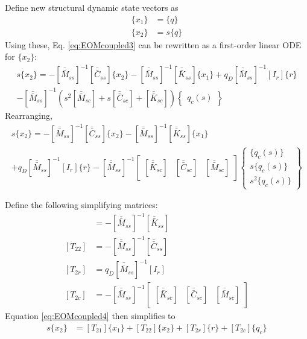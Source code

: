 Define new structural dynamic state vectors as
\begin{align}
	\{x_1\} &= \{q\} \\
	\{x_2\} &= s \{q\}
\end{align}
Using these, Eq. \ref{eq:EOMcoupled3} can be rewritten as a first-order linear ODE for $\{x_2\}$:
\begin{multline}
	s \{x_2\} = - \left[\bar{\bar{M}}_{ss}\right]^{-1} \left[\bar{\bar{C}}_{ss}\right] \{x_2\}
	- \left[\bar{\bar{M}}_{ss}\right]^{-1} \left[\bar{\bar{K}}_{ss}\right] \{x_1\}
	+ q_D \left[\bar{\bar{M}}_{ss}\right]^{-1} [I_r] \{r\}
	\\
	- \left[\bar{\bar{M}}_{ss}\right]^{-1} \left( s^2 \left[\bar{\bar{M}}_{sc}\right] + s \left[\bar{\bar{C}}_{sc}\right] + \left[\bar{\bar{K}}_{sc}\right] \right) \begin{Bmatrix} q_c(s) \end{Bmatrix}
\end{multline}
Rearranging,
\begin{multline}
	\label{eq:EOMcoupled4}
	s\{x_2\} = - \left[\bar{\bar{M}}_{ss}\right]^{-1} \left[\bar{\bar{C}}_{ss}\right] \{x_2\}
	- \left[\bar{\bar{M}}_{ss}\right]^{-1} \left[\bar{\bar{K}}_{ss}\right] \{x_1\}
	\\
	+ q_D \left[\bar{\bar{M}}_{ss}\right]^{-1} [I_r] \{r\}
	- \left[\bar{\bar{M}}_{ss}\right]^{-1}
	\begin{bmatrix}
		\left[\bar{\bar{K}}_{sc}\right] & \left[\bar{\bar{C}}_{sc}\right] & \left[\bar{\bar{M}}_{sc}\right]
	\end{bmatrix}
	\begin{Bmatrix} \{q_c(s)\} \\ s \{q_c(s)\} \\ s^2 \{q_c(s)\} \end{Bmatrix}
\end{multline}

Define the following simplifying matrices:
\begin{align}
	[T_{21}] &= - \left[\bar{\bar{M}}_{ss}\right]^{-1} \left[\bar{\bar{K}}_{ss}\right] \\
	[T_{22}] &= - \left[\bar{\bar{M}}_{ss}\right]^{-1} \left[\bar{\bar{C}}_{ss}\right] \\
	[T_{2r}] &= q_D \left[\bar{\bar{M}}_{ss}\right]^{-1} [I_r] \\
	[T_{2c}] &= -\left[\bar{\bar{M}}_{ss}\right]^{-1}
		\begin{bmatrix}
		\left[\bar{\bar{K}}_{sc}\right] & \left[\bar{\bar{C}}_{sc}\right] & \left[\bar{\bar{M}}_{sc}\right]
		\end{bmatrix}
\end{align}
Equation \ref{eq:EOMcoupled4} then simplifies to
\begin{align}
	s\{x_2\} &= [T_{21}] \{x_1\} + [T_{22}] \{x_2\} + [T_{2r}] \{r\} + [T_{2c}] \{q_c\}
\end{align}

